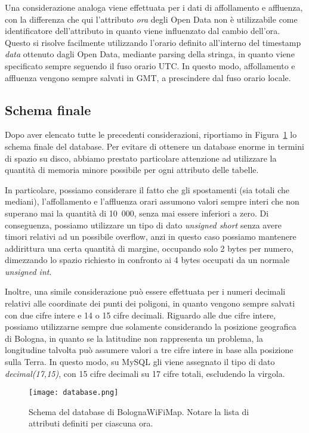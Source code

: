 Una considerazione analoga viene effettuata per i dati di affollamento e affluenza, con la differenza che qui l'attributo \textit{ora} degli Open Data non è utilizzabile come identificatore dell'attributo in quanto viene influenzato dal cambio dell'ora. Questo si risolve facilmente utilizzando l'orario definito all'interno del timestamp \textit{data} ottenuto dagli Open Data, mediante parsing della stringa, in quanto viene specificato sempre seguendo il fuso orario UTC. In questo modo, affollamento e affluenza vengono sempre salvati in GMT, a prescindere dal fuso orario locale.

\subsection{Schema finale}
Dopo aver elencato tutte le precedenti considerazioni, riportiamo in Figura~\ref{fig:database} lo schema finale del database. Per evitare di ottenere un database enorme in termini di spazio su disco, abbiamo prestato particolare attenzione ad utilizzare la quantità di memoria minore possibile per ogni attributo delle tabelle.

In particolare, possiamo considerare il fatto che gli spostamenti (sia totali che mediani), l'affollamento e l'affluenza orari assumono valori sempre interi che non superano mai la quantità di 10~000, senza mai essere inferiori a zero. Di conseguenza, possiamo utilizzare un tipo di dato \textit{unsigned short} senza avere timori relativi ad un possibile overflow, anzi in questo caso possiamo mantenere addirittura una certa quantità di margine, occupando solo 2 bytes per numero, dimezzando lo spazio richiesto in confronto ai 4 bytes occupati da un normale \textit{unsigned int}.

Inoltre, una simile considerazione può essere effettuata per i numeri decimali relativi alle coordinate dei punti dei poligoni, in quanto vengono sempre salvati con due cifre intere e 14 o 15 cifre decimali. Riguardo alle due cifre intere, possiamo utilizzarne sempre due solamente considerando la posizione geografica di Bologna, in quanto se la latitudine non rappresenta un problema, la longitudine talvolta può assumere valori a tre cifre intere in base alla posizione sulla Terra. In questo modo, su MySQL gli viene assegnato il tipo di dato \textit{decimal(17,15)}, con 15 cifre decimali su 17 cifre totali, escludendo la virgola.

\begin{figure}[H]
    \centering
    \texttt{[image: database.png]}
    \caption[Schema del database]{Schema del database di BolognaWiFiMap. Notare la lista di attributi definiti per ciascuna ora.}
    \label{fig:database}
\end{figure}

